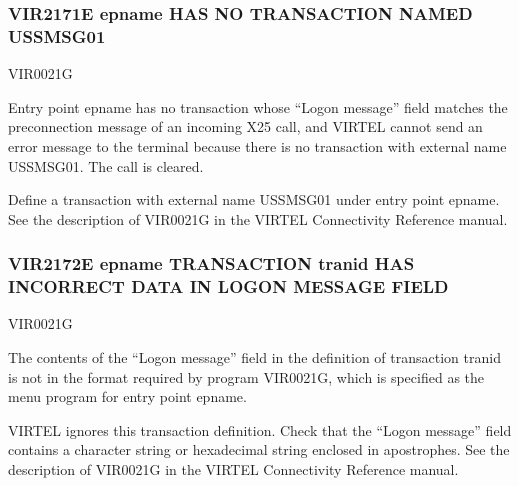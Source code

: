 \documentclass[letterpaper,10pt,english]{sphinxmanual}
\begin{document}
\subsubsection{VIR2171E epname HAS NO TRANSACTION NAMED USSMSG01}
\label{\detokenize{messages:vir2171e-epname-has-no-transaction-named-ussmsg01}}\begin{description}
\sphinxAtStartPar
VIR0021G

\sphinxAtStartPar
Entry point epname has no transaction whose “Logon message” field matches the preconnection message of an incoming X25 call, and VIRTEL cannot send an error message to the terminal because there is no transaction with external name USSMSG01. The call is cleared.

\sphinxAtStartPar
Define a transaction with external name USSMSG01 under entry point epname. See the description of VIR0021G in the VIRTEL Connectivity Reference manual.

\end{description}


\subsubsection{VIR2172E epname TRANSACTION tranid HAS INCORRECT DATA IN LOGON MESSAGE FIELD}
\label{\detokenize{messages:vir2172e-epname-transaction-tranid-has-incorrect-data-in-logon-message-field}}\begin{description}
\sphinxAtStartPar
VIR0021G

\sphinxAtStartPar
The contents of the “Logon message” field in the definition of transaction tranid is not in the format required by program VIR0021G, which is specified as the menu program for entry point epname.

\sphinxAtStartPar
VIRTEL ignores this transaction definition. Check that the “Logon message” field contains a character string or hexadecimal string enclosed in apostrophes. See the description of VIR0021G in the VIRTEL Connectivity Reference manual.

\end{description}
\end{document}
